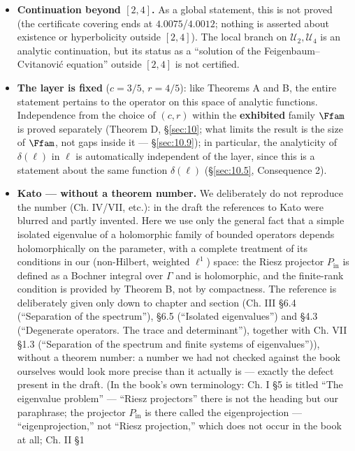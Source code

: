\begin{itemize}
\item \textbf{Continuation beyond \boldmath$[2,4]$.} As a global statement, this is not proved
  (the certificate covering ends at $4.0075$/$4.0012$; nothing is asserted
  about existence or hyperbolicity outside $[2,4]$). The local branch on
  $\mathcal U_2,\mathcal U_4$ is an analytic continuation, but its status as
  a ``solution of the Feigenbaum--Cvitanović equation'' outside $[2,4]$ is not
  certified.
\item \textbf{The layer is fixed} ($c=3/5$, $r=4/5$): like Theorems A and B, the
  entire statement pertains to the operator on this space of analytic
  functions. Independence from the choice of $(c,r)$ within the
  \textbf{exhibited} family $\Ffam$ is proved separately (Theorem D, \S\ref{sec:10};
  what limits the result is the size of $\Ffam$, not gaps inside it --- \S\ref{sec:10.9}); in
  particular, the analyticity of $\delta(\ell)$ in $\ell$ is
  automatically independent of the layer, since this is a statement about the
  same function $\delta(\ell)$ (\S\ref{sec:10.5}, Consequence 2).
\item \textbf{Kato --- without a theorem number.} We deliberately do not reproduce the
  number (Ch. IV/VII, etc.): in the draft the references to Kato were
  blurred and partly invented. Here we use only the general fact that a
  simple isolated eigenvalue of a holomorphic family of bounded operators
  depends holomorphically on the parameter, with a complete treatment of
  its conditions in our (non-Hilbert, weighted $\ell^1$) space: the Riesz
  projector $P_{\mathrm{in}}$ is defined as a Bochner integral over $\Gamma$
  and is holomorphic, and the finite-rank condition is provided by Theorem
  B, not by compactness. The reference is deliberately given only down to
  chapter and section (Ch. III \S6.4 (``Separation of the spectrum''), \S6.5
  (``Isolated eigenvalues'') and \S4.3 (``Degenerate operators. The trace
  and determinant''), together with Ch. VII \S1.3 (``Separation of the
  spectrum and finite systems of eigenvalues'')), without a theorem number: a number we had not
  checked against the book ourselves would look more precise than it
  actually is --- exactly the defect present in the draft. (In the book's own
  terminology: Ch. I \S5 is titled ``The eigenvalue problem'' --- ``Riesz
  projectors'' there is not the heading but our paraphrase; the projector
  $P_{\mathrm{in}}$ is there called the eigenprojection --- ``eigenprojection,''
  not ``Riesz projection,'' which does not occur in the book at all; Ch. II \S1

\end{itemize}
